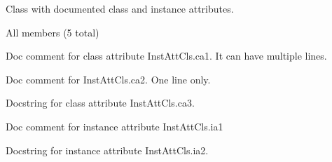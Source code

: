 \documentclass[letterpaper,10pt,english]{sphinxhowto}
\begin{document}
\begin{fulllineitems}
\label{autodoc:test_autodoc.InstAttCls}
Class with documented class and instance attributes.

All members (5 total)

\begin{fulllineitems}
\label{autodoc:test_autodoc.InstAttCls.ca1}
Doc comment for class attribute InstAttCls.ca1.
It can have multiple lines.

\end{fulllineitems}


\begin{fulllineitems}
\label{autodoc:test_autodoc.InstAttCls.ca2}
Doc comment for InstAttCls.ca2. One line only.

\end{fulllineitems}


\begin{fulllineitems}
\label{autodoc:test_autodoc.InstAttCls.ca3}
Docstring for class attribute InstAttCls.ca3.

\end{fulllineitems}


\begin{fulllineitems}
\label{autodoc:test_autodoc.InstAttCls.ia1}
Doc comment for instance attribute InstAttCls.ia1

\end{fulllineitems}


\begin{fulllineitems}
\label{autodoc:test_autodoc.InstAttCls.ia2}
Docstring for instance attribute InstAttCls.ia2.

\end{fulllineitems}


\end{fulllineitems}
\end{document}

